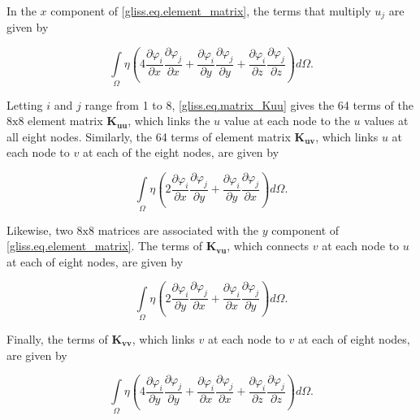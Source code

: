 In the $x$ component of \eqref{gliss.eq.element_matrix}, 
the terms that multiply $u_j$ are given by
 
\begin{equation}
  \label{gliss.eq.matrix_Kuu}
  \int\limits_{\Omega }{\eta \left( 4\frac{\partial {{\varphi }_{i}}}{\partial x}\frac{\partial {{\varphi }_{j}}}{\partial x} +
    \frac{\partial {{\varphi }_{i}}}{\partial y}\frac{\partial {{\varphi}_{j}}}{\partial y} + 
    \frac{\partial {{\varphi }_{i}}}{\partial z}\frac{\partial {{\varphi }_{j}}}{\partial z} \right)}d\Omega.
\end{equation}

\noindent
Letting $i$ and $j$ range from 1 to 8, \eqref{gliss.eq.matrix_Kuu} gives the 64 terms of the $8\text{x}8$ element matrix $\mathbf{K_{uu}}$,
which links the $u$ value at each node to the $u$ values at all eight nodes.
Similarly, the 64 terms of element matrix $\mathbf{K_{uv}}$, which links $u$ at each node to $v$ at each of the eight nodes,
are given by

\begin{equation}
  \label{gliss.eq.matrix_Kuv}
  \int\limits_{\Omega }{\eta \left( 2\frac{\partial {{\varphi }_{i}}}{\partial x}\frac{\partial {{\varphi }_{j}}}{\partial y}+\frac{\partial {{\varphi }_{i}}}{\partial y}\frac{\partial {{\varphi }_{j}}}{\partial x} \right)}d\Omega.
\end{equation}

Likewise, two $8\text{x}8$ matrices are associated with the $y$ component of \eqref{gliss.eq.element_matrix}.  
The terms of $\mathbf{K_{vu}}$, which connects $v$ at each node to $u$ at each of eight nodes, are given by

\begin{equation}
  \label{gliss.eq.matrix_Kvu}
  \int\limits_{\Omega }{\eta \left( 2\frac{\partial {{\varphi }_{i}}}{\partial y}\frac{\partial {{\varphi }_{j}}}{\partial x}+\frac{\partial {{\varphi }_{i}}}{\partial x}\frac{\partial {{\varphi }_{j}}}{\partial y} \right)}d\Omega.
\end{equation}

\noindent
Finally, the terms of $\mathbf{K_{vv}}$, which links $v$ at each node to $v$ at each of eight nodes, are given by

\begin{equation}
  \label{gliss.eq.matrix_Kvv}
  \int\limits_{\Omega }{\eta \left( 4\frac{\partial {{\varphi }_{i}}}{\partial y}\frac{\partial {{\varphi }_{j}}}{\partial y}+\frac{\partial {{\varphi }_{i}}}{\partial x}\frac{\partial {{\varphi}_{j}}}{\partial x}+\frac{\partial {{\varphi }_{i}}}{\partial z}\frac{\partial {{\varphi }_{j}}}{\partial z} \right)}d\Omega.
\end{equation}

